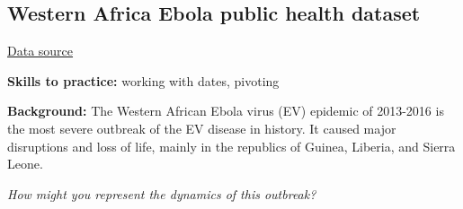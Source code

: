 \documentclass[
  letterpaper,
  DIV=11,
  numbers=noendperiod]{scrreprt}
\begin{document}
\hypertarget{western-africa-ebola-public-health-dataset}{%
\subsection{Western Africa Ebola public health
dataset}\label{western-africa-ebola-public-health-dataset}}

\href{https://www.kaggle.com/datasets/imdevskp/ebola-outbreak-20142016-complete-dataset}{Data
source}

\textbf{Skills to practice:} working with dates, pivoting

\textbf{Background:} The Western African Ebola virus (EV) epidemic of
2013-2016 is the most severe outbreak of the EV disease in history. It
caused major disruptions and loss of life, mainly in the republics of
Guinea, Liberia, and Sierra Leone.

\emph{How might you represent the dynamics of this outbreak?}
\end{document}
